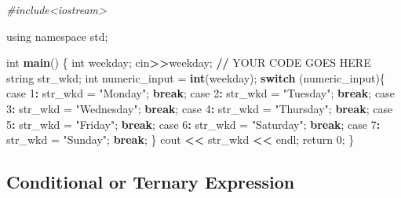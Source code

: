 \documentclass[
]{article}
\newenvironment{Shaded}{\begin{snugshade}}{\end{snugshade}}
\newcommand{\CommentTok}[1]{\textcolor[rgb]{0.56,0.35,0.01}{\textit{#1}}}
\newcommand{\ControlFlowTok}[1]{\textcolor[rgb]{0.13,0.29,0.53}{\textbf{#1}}}
\newcommand{\DecValTok}[1]{\textcolor[rgb]{0.00,0.00,0.81}{#1}}
\newcommand{\ErrorTok}[1]{\textcolor[rgb]{0.64,0.00,0.00}{\textbf{#1}}}
\newcommand{\FunctionTok}[1]{\textcolor[rgb]{0.13,0.29,0.53}{\textbf{#1}}}
\newcommand{\NormalTok}[1]{#1}
\newcommand{\OtherTok}[1]{\textcolor[rgb]{0.56,0.35,0.01}{#1}}
\newcommand{\SpecialCharTok}[1]{\textcolor[rgb]{0.81,0.36,0.00}{\textbf{#1}}}
\newcommand{\StringTok}[1]{\textcolor[rgb]{0.31,0.60,0.02}{#1}}
\begin{document}
\begin{Shaded}
\begin{Highlighting}[]
\CommentTok{\#include\textless{}iostream\textgreater{}}

\NormalTok{using namespace std;}

\NormalTok{int }\FunctionTok{main}\NormalTok{()  \{}
\NormalTok{    int weekday;}
\NormalTok{    cin}\SpecialCharTok{\textgreater{}}\ErrorTok{\textgreater{}}\NormalTok{weekday;}
    \SpecialCharTok{/}\ErrorTok{/}\NormalTok{ YOUR CODE GOES HERE}
\NormalTok{    string str\_wkd;}
\NormalTok{    int numeric\_input }\OtherTok{=} \FunctionTok{int}\NormalTok{(weekday);}
    \ControlFlowTok{switch}\NormalTok{ (numeric\_input)\{}
\NormalTok{        case }\DecValTok{1}\SpecialCharTok{:} 
\NormalTok{            str\_wkd }\OtherTok{=} \StringTok{"Monday"}\NormalTok{;}
            \ControlFlowTok{break}\NormalTok{;}
\NormalTok{        case }\DecValTok{2}\SpecialCharTok{:}
\NormalTok{            str\_wkd }\OtherTok{=} \StringTok{"Tuesday"}\NormalTok{;}
            \ControlFlowTok{break}\NormalTok{;}
\NormalTok{        case }\DecValTok{3}\SpecialCharTok{:}
\NormalTok{            str\_wkd }\OtherTok{=} \StringTok{"Wednesday"}\NormalTok{;}
            \ControlFlowTok{break}\NormalTok{;}
\NormalTok{        case }\DecValTok{4}\SpecialCharTok{:}
\NormalTok{            str\_wkd }\OtherTok{=} \StringTok{"Thursday"}\NormalTok{;}
            \ControlFlowTok{break}\NormalTok{;}
\NormalTok{        case }\DecValTok{5}\SpecialCharTok{:} 
\NormalTok{            str\_wkd }\OtherTok{=} \StringTok{"Friday"}\NormalTok{;}
            \ControlFlowTok{break}\NormalTok{;}
\NormalTok{        case }\DecValTok{6}\SpecialCharTok{:}
\NormalTok{            str\_wkd }\OtherTok{=} \StringTok{"Saturday"}\NormalTok{;}
            \ControlFlowTok{break}\NormalTok{;}
\NormalTok{        case }\DecValTok{7}\SpecialCharTok{:}
\NormalTok{            str\_wkd }\OtherTok{=} \StringTok{"Sunday"}\NormalTok{;  }
            \ControlFlowTok{break}\NormalTok{;}
\NormalTok{    \}}
\NormalTok{    cout }\SpecialCharTok{\textless{}}\ErrorTok{\textless{}}\NormalTok{ str\_wkd }\SpecialCharTok{\textless{}}\ErrorTok{\textless{}}\NormalTok{ endl;}
\NormalTok{    return }\DecValTok{0}\NormalTok{;}
\NormalTok{\} }
\end{Highlighting}
\end{Shaded}

\subsection{Conditional or Ternary
Expression}\label{conditional-or-ternary-expression}
\end{document}
